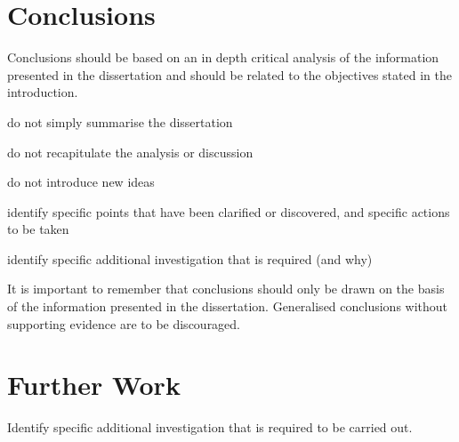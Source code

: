 \section{Conclusions}
Conclusions should be based on an in depth critical analysis of the information presented in the dissertation and should be related to the objectives stated in the introduction.

\newpage
do not simply summarise the dissertation

do not recapitulate the analysis or discussion

do not introduce new ideas

identify specific points that have been clarified or discovered, and specific actions to be taken

identify specific additional investigation that is required (and why)

\newpage
It is important to remember that conclusions should only be drawn on the basis of the information presented in the dissertation. Generalised conclusions without supporting evidence are to be
discouraged.
\newpage

\section{Further Work}
Identify specific additional investigation that is required to be carried out.

\newpage
